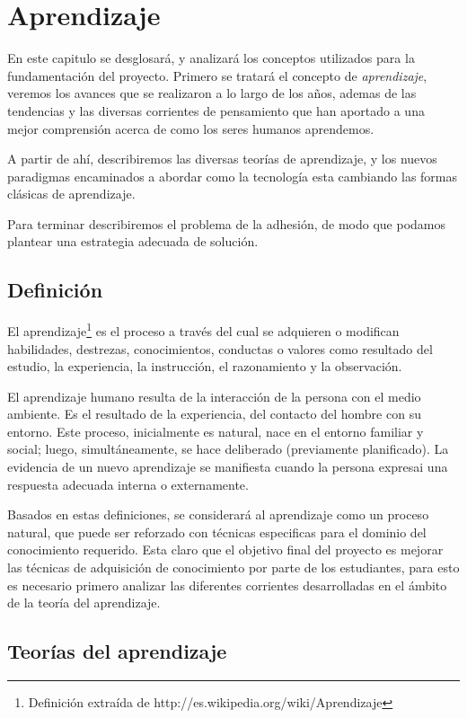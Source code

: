 \chapter{Aprendizaje}

En este capitulo se desglosará, y analizará los conceptos utilizados para la
fundamentación del proyecto. Primero se tratará el concepto de
\emph{aprendizaje}, veremos los avances que se realizaron a lo largo de los
años, ademas de las tendencias y las diversas corrientes de pensamiento que han
aportado a una mejor comprensión acerca de como los seres humanos aprendemos.

A partir de ahí, describiremos las diversas teorías de aprendizaje, y los nuevos
paradigmas encaminados a abordar como la tecnología esta cambiando las formas
clásicas de aprendizaje.

Para terminar describiremos el problema de la adhesión, de modo que podamos
plantear una estrategia adecuada de solución.

\section{Definición}

El aprendizaje\footnote{Definición extraída de
http://es.wikipedia.org/wiki/Aprendizaje} es el proceso a través del cual se
adquieren o modifican habilidades, destrezas, conocimientos, conductas o valores
como resultado del estudio, la experiencia, la instrucción, el razonamiento y la
observación.

El aprendizaje humano resulta de la interacción de la persona con el medio
ambiente. Es el resultado de la experiencia, del contacto del hombre con su
entorno. Este proceso, inicialmente es natural, nace en el entorno familiar y
social; luego, simultáneamente, se hace deliberado (previamente planificado).
La evidencia de un nuevo aprendizaje se manifiesta cuando la persona expresai
una respuesta adecuada interna o externamente.\cite{Rojas}

Basados en estas definiciones, se considerará al aprendizaje como un proceso
natural, que puede ser reforzado con técnicas especificas para el dominio del 
conocimiento requerido. Esta claro que el objetivo final del proyecto es mejorar
las técnicas de adquisición de conocimiento por parte de los estudiantes, para
esto es necesario primero analizar las diferentes corrientes desarrolladas en el
ámbito de la teoría del aprendizaje.

\section{Teorías del aprendizaje}

